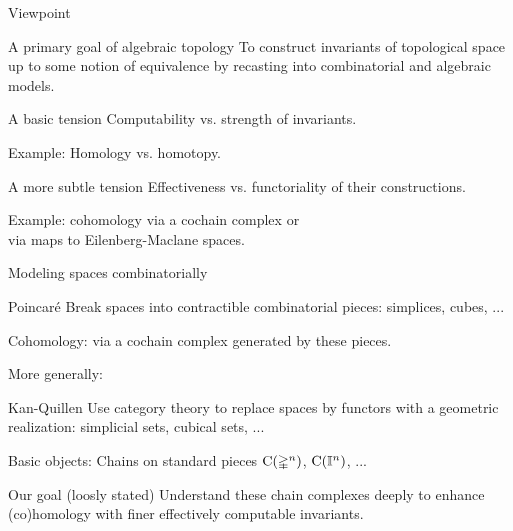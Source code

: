 
\begin{frame}{Viewpoint}
	\vskip -10pt
	\begin{block}{A primary goal of algebraic topology}
		To construct invariants of topological space up to some notion of equivalence by recasting into combinatorial and algebraic models.
	\end{block}

	\medskip \pause
	\begin{block}{A basic tension}
		Computability vs. strength of invariants.
	\end{block}

	\medskip \textcolor{pblue}{Example:}
	Homology vs. homotopy.

	\medskip \pause
	\begin{block}{A more subtle tension}
		Effectiveness vs. functoriality of their constructions.
	\end{block}

	\medskip \textcolor{pblue}{Example:}
	cohomology via a cochain complex or \\
	\hspace*{40pt} via maps to Eilenberg-Maclane spaces.
\end{frame}

\begin{frame}{Modeling spaces combinatorially}
	\pause
	\begin{block}{Poincar\'{e}}
		Break spaces into contractible combinatorial pieces: simplices, cubes, ...
	\end{block}

	\pause \textcolor{pblue}{Cohomology:}
	via a cochain complex generated by these pieces.

	\medskip \pause	More generally:
	\begin{block}{Kan-Quillen}
		Use category theory to replace spaces by functors with a geometric realization: simplicial sets, cubical sets, ...
	\end{block}

	\pause \textcolor{pblue}{Basic objects:}
	Chains on standard pieces $\operatorname{C}(\mathbb{\Delta}^n)$, $\operatorname{C}(\mathbb{I}^n)$, ...

	\smallskip \pause
	\begin{block}{Our goal (loosly stated)}
		Understand these chain complexes deeply to enhance (co)homology with finer effectively computable invariants.
	\end{block}
\end{frame}

